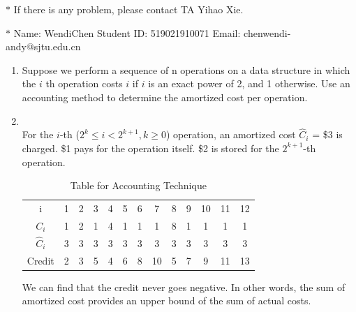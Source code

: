 \documentclass[12pt,a4paper]{article}
\makeatletter
\newtheorem*{solution}{Solution}
\theoremstyle{definition}
\renewenvironment{solution}[1][Solution] {\par\pushQED{\qed}\normalfont\topsep6\p@\@plus6\p@\relax\trivlist\item[\hskip\labelsep\bfseries#1\@addpunct{.}]\ignorespaces}{\popQED\endtrivlist\@endpefalse} \makeatother
\makeatother
\begin{document}
\noindent

\noindent{}
\begin{center}
\footnotesize{\color{red}$*$ If there is any problem, please contact TA Yihao Xie. }

\footnotesize{\color{blue}$*$ Name: WendiChen  \quad Student ID: 519021910071 \quad Email: chenwendi-andy@sjtu.edu.cn}
\end{center}
\begin{enumerate}
	\item Suppose we perform a sequence of n operations on a data structure in which the $i$ th 		operation costs $i$ if $i$ is an exact power of 2, and 1 otherwise. Use an accounting method to determine the amortized cost per operation.
	
	\begin{solution}
	~\\
	For the $i$-th ($2^k\le i < 2^{k+1},k\ge 0$) operation, an amortized cost $\widehat{C}_i$ = \$3 is charged. \$1 pays for the operation itself. \$2 is stored for the $2^{k+1}$-th operation.
	
    \begin{table}[htbp]
      \centering
      \caption{Table for Accounting Technique}
        \begin{tabular}{ccccccccccccc}
        i     & 1     & 2     & 3     & 4     & 5     & 6     & 7     & 8     & 9     & 10    & 11    & 12 \\
        $C_i$    & 1     & 2     & 1     & 4     & 1     & 1     & 1     & 8     & 1     & 1     & 1     & 1 \\
        $\widehat{C}_i$    & 3     & 3     & 3     & 3     & 3     & 3     & 3     & 3     & 3     & 3     & 3     & 3 \\
        Credit & 2     & 3     & 5     & 4     & 6     & 8     & 10    & 5     & 7     & 9     & 11    & 13 \\
        \end{tabular}%
      \label{tab:accounting}%
    \end{table}%
    
    We can find that the credit never goes negative. In other words, the sum of amortized cost provides an upper bound of the sum of actual costs.
    

\end{solution}
\end{enumerate}
\end{document}
